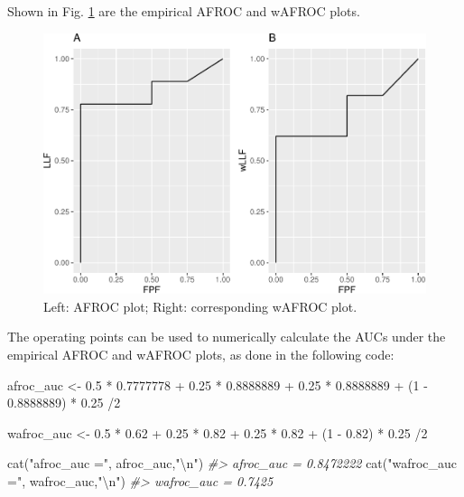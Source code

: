 \documentclass[
]{book}
\newenvironment{Shaded}{\begin{snugshade}}{\end{snugshade}}
\newcommand{\CommentTok}[1]{\textcolor[rgb]{0.56,0.35,0.01}{\textit{#1}}}
\newcommand{\DecValTok}[1]{\textcolor[rgb]{0.00,0.00,0.81}{#1}}
\newcommand{\FloatTok}[1]{\textcolor[rgb]{0.00,0.00,0.81}{#1}}
\newcommand{\FunctionTok}[1]{\textcolor[rgb]{0.00,0.00,0.00}{#1}}
\newcommand{\NormalTok}[1]{#1}
\newcommand{\OtherTok}[1]{\textcolor[rgb]{0.56,0.35,0.01}{#1}}
\newcommand{\SpecialCharTok}[1]{\textcolor[rgb]{0.00,0.00,0.00}{#1}}
\newcommand{\StringTok}[1]{\textcolor[rgb]{0.31,0.60,0.02}{#1}}
\begin{document}
Shown in Fig. \ref{fig:plots-afrocPlot-wafrocPlot} are the empirical AFROC and wAFROC plots.

\begin{figure}
\centering
\includegraphics{03-empirical_files/figure-latex/plots-afrocPlot-wafrocPlot-1.pdf}
\caption{\label{fig:plots-afrocPlot-wafrocPlot}Left: AFROC plot; Right: corresponding wAFROC plot.}
\end{figure}

The operating points can be used to numerically calculate the AUCs under the empirical AFROC and wAFROC plots, as done in the following code:

\begin{Shaded}
\begin{Highlighting}[]
\NormalTok{afroc\_auc }\OtherTok{\textless{}{-}} \FloatTok{0.5} \SpecialCharTok{*} \FloatTok{0.7777778} \SpecialCharTok{+} 
  \FloatTok{0.25} \SpecialCharTok{*} \FloatTok{0.8888889} \SpecialCharTok{+} 
  \FloatTok{0.25} \SpecialCharTok{*} \FloatTok{0.8888889} \SpecialCharTok{+}\NormalTok{ (}\DecValTok{1} \SpecialCharTok{{-}} \FloatTok{0.8888889}\NormalTok{) }\SpecialCharTok{*} \FloatTok{0.25} \SpecialCharTok{/}\DecValTok{2}

\NormalTok{wafroc\_auc }\OtherTok{\textless{}{-}} \FloatTok{0.5} \SpecialCharTok{*} \FloatTok{0.62} \SpecialCharTok{+} 
  \FloatTok{0.25} \SpecialCharTok{*} \FloatTok{0.82} \SpecialCharTok{+} 
  \FloatTok{0.25} \SpecialCharTok{*} \FloatTok{0.82} \SpecialCharTok{+} 
\NormalTok{  (}\DecValTok{1} \SpecialCharTok{{-}} \FloatTok{0.82}\NormalTok{) }\SpecialCharTok{*} \FloatTok{0.25} \SpecialCharTok{/}\DecValTok{2}

\FunctionTok{cat}\NormalTok{(}\StringTok{"afroc\_auc ="}\NormalTok{, afroc\_auc,}\StringTok{"}\SpecialCharTok{\textbackslash{}n}\StringTok{"}\NormalTok{)}
\CommentTok{\#\textgreater{} afroc\_auc = 0.8472222}
\FunctionTok{cat}\NormalTok{(}\StringTok{"wafroc\_auc ="}\NormalTok{, wafroc\_auc,}\StringTok{"}\SpecialCharTok{\textbackslash{}n}\StringTok{"}\NormalTok{)}
\CommentTok{\#\textgreater{} wafroc\_auc = 0.7425}
\end{Highlighting}
\end{Shaded}
\end{document}
